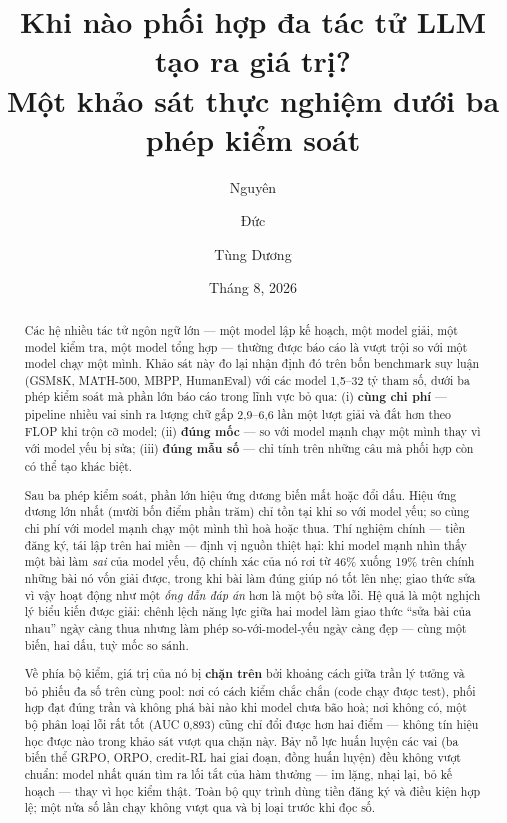 \documentclass[11pt,a4paper]{article}
\title{\bfseries Khi nào phối hợp đa tác tử LLM tạo ra giá trị?\\
\large Một khảo sát thực nghiệm dưới ba phép kiểm soát}
\author{Nguyên \and Đức \and Tùng Dương}
\date{Tháng 8, 2026}
\begin{document}
\maketitle

\begin{abstract}
Các hệ nhiều tác tử ngôn ngữ lớn --- một model lập kế hoạch, một model giải, một model kiểm tra,
một model tổng hợp --- thường được báo cáo là vượt trội so với một model chạy một mình. Khảo sát
này đo lại nhận định đó trên bốn benchmark suy luận (GSM8K, MATH-500, MBPP, HumanEval) với các
model 1,5--32 tỷ tham số, dưới ba phép kiểm soát mà phần lớn báo cáo trong lĩnh vực bỏ qua: (i)
\textbf{cùng chi phí} --- pipeline nhiều vai sinh ra lượng chữ gấp 2,9--6,6 lần một lượt giải và
đắt hơn theo FLOP khi trộn cỡ model; (ii) \textbf{đúng mốc} --- so với model mạnh chạy một mình
thay vì với model yếu bị sửa; (iii) \textbf{đúng mẫu số} --- chỉ tính trên những câu mà phối hợp
còn có thể tạo khác biệt.

Sau ba phép kiểm soát, phần lớn hiệu ứng dương biến mất hoặc đổi dấu. Hiệu ứng dương lớn nhất
(mười bốn điểm phần trăm) chỉ tồn tại khi so với model yếu; so cùng chi phí với model mạnh chạy
một mình thì hoà hoặc thua. Thí nghiệm chính --- tiền đăng ký, tái lập trên hai miền --- định vị
nguồn thiệt hại: khi model mạnh nhìn thấy một bài làm \emph{sai} của model yếu, độ chính xác của
nó rơi từ 46\% xuống 19\% trên chính những bài nó vốn giải được, trong khi bài làm đúng giúp nó
tốt lên nhẹ; giao thức sửa vì vậy hoạt động như một \emph{ống dẫn đáp án} hơn là một bộ sửa lỗi.
Hệ quả là một nghịch lý biểu kiến được giải: chênh lệch năng lực giữa hai model làm giao thức
``sửa bài của nhau'' ngày càng thua nhưng làm phép so-với-model-yếu ngày càng đẹp --- cùng một
biến, hai dấu, tuỳ mốc so sánh.

Về phía bộ kiểm, giá trị của nó bị \textbf{chặn trên} bởi khoảng cách giữa trần lý tưởng và bỏ
phiếu đa số trên cùng pool: nơi có cách kiểm chắc chắn (code chạy được test), phối hợp đạt đúng
trần và không phá bài nào khi model chưa bão hoà; nơi không có, một bộ phân loại lỗi rất tốt
(AUC 0,893) cũng chỉ đổi được hơn hai điểm --- không tín hiệu học được nào trong khảo sát vượt
qua chặn này. Bảy nỗ lực huấn luyện các vai (ba biến thể GRPO, ORPO, credit-RL hai giai đoạn,
đồng huấn luyện) đều không vượt chuẩn: model nhất quán tìm ra lối tắt của hàm thưởng --- im
lặng, nhại lại, bỏ kế hoạch --- thay vì học kiểm thật. Toàn bộ quy trình dùng tiền đăng ký và
điều kiện hợp lệ; một nửa số lần chạy không vượt qua và bị loại trước khi đọc số.
\end{abstract}
\end{document}
